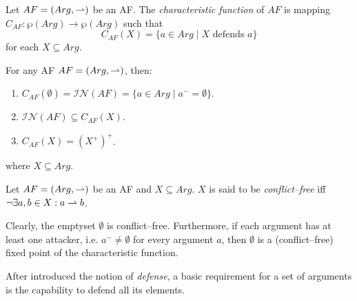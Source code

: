 \begin{df}
    Let $AF=(Arg,\rightharpoonup)$ be an AF. 
    The \textit{characteristic function} of $AF$ is mapping 
    $C_{AF} \colon \wp(Arg) \to \wp(Arg)$ such that 
    \[
        C_{AF} (X) 
            = 
        \{a \in Arg \mid X \text{~defends~} a\}
    \]
    for each $X \subseteq Arg$.       
\end{df}



\begin{prop} 
    For any AF $AF=(Arg,\rightharpoonup)$, 
    then:
    \begin{enumerate}[itemsep=5pt,parsep=5pt,leftmargin=3em,topsep=5pt,label=(\arabic*)] %
        \item 
        $C_{AF}(\emptyset)=\mathcal{IN}(AF)=\{a \in Arg \mid a^- = \emptyset\}$.
        

        \item 
        $\mathcal{IN}(AF) \subseteq C_{AF}(X)$.


        \item $C_{AF}(X) = (X^+)^+$.
    \end{enumerate}
    where $X \subseteq Arg$.
\end{prop}




\begin{df}
    Let $AF=(Arg,\rightharpoonup)$ be an AF and $X \subseteq Arg$.
    $X$ is said to be  \textit{conflict--free}  iff 
    $\neg\exists a,b \in X: a \rightharpoonup b$.  
\end{df}



Clearly, 
the emptyset $\emptyset$ is conflict--free.
%
Furthermore,  
if each argument has at least one attacker, 
i.e. $a^- \not=\emptyset$ for every argument $a$, 
then  $\emptyset$ is a (conflict--free) fixed point of the characteristic function.




After introduced the notion of \textit{defense}, 
a basic requirement for a set of arguments is the capability to defend all its elements. 
% 




